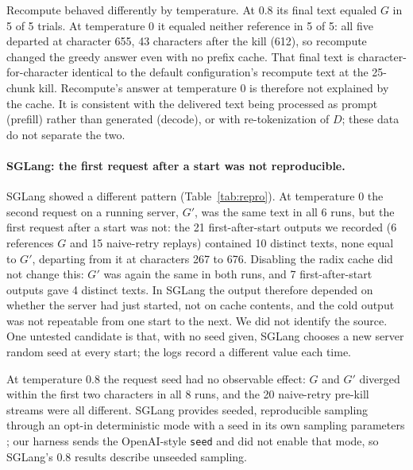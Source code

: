 \documentclass[10pt,twocolumn]{article}
\begin{document}
Recompute behaved differently by temperature. At 0.8 its final text equaled
$G$ in 5 of 5 trials. At temperature 0 it equaled neither reference in 5 of
5: all five departed at character 655, 43 characters after the kill (612), so
recompute changed the greedy answer even with no prefix cache. That final
text is character-for-character identical to the default configuration's
recompute text at the 25-chunk kill. Recompute's answer at temperature 0 is
therefore not explained by the cache. It is consistent with the delivered
text being processed as prompt (prefill) rather than generated (decode), or
with re-tokenization of $D$; these data do not separate the two.

\paragraph{SGLang: the first request after a start was not reproducible.}
SGLang showed a different pattern (Table~\ref{tab:repro}). At temperature 0
the second request on a running server, $G'$, was the same text in all 6
runs, but the first request after a start was not: the 21
first-after-start outputs we recorded (6 references $G$ and 15 naive-retry
replays) contained 10 distinct texts, none equal to $G'$, departing from it
at characters 267 to 676. Disabling the radix cache did not change this:
$G'$ was again the same in both runs, and 7 first-after-start outputs gave 4
distinct texts. In SGLang the output therefore depended on whether the server
had just started, not on cache contents, and the cold output was not
repeatable from one start to the next. We did not identify the source. One
untested candidate is that, with no seed given, SGLang chooses a new server
random seed at every start; the logs record a different value each time.

At temperature 0.8 the request seed had no observable effect: $G$ and $G'$
diverged within the first two characters in all 8 runs, and the 20
naive-retry pre-kill streams were all different. SGLang provides seeded,
reproducible sampling through an opt-in deterministic mode with a seed in
its own sampling parameters \cite{sglang2025deterministic}; our harness sends
the OpenAI-style \texttt{seed} and did not enable that mode, so SGLang's 0.8
results describe unseeded sampling.
\end{document}
